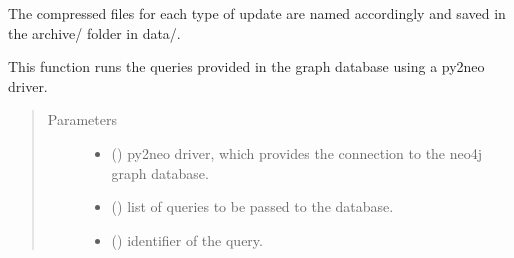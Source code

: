 \documentclass[letterpaper,10pt,english]{sphinxmanual}
\begin{document}
The compressed files for each type of update are named accordingly and saved in the archive/ folder
in data/.

\begin{fulllineitems}
\label{\detokenize{_autosummary/graphdb_builder.builder:graphdb_builder.builder.loader.load_into_database}}
This function runs the queries provided in the graph database using a py2neo driver.
\begin{quote}\begin{description}
\item[{Parameters}] \leavevmode\begin{itemize}
\item {} 
 () \textendash{} py2neo driver, which provides the connection to the neo4j graph database.

\item {} 
 (\sphinxstyleliteralemphasis{\sphinxupquote{{[}}}\sphinxstyleliteralemphasis{\sphinxupquote{{]}}}) \textendash{} list of queries to be passed to the database.

\item {} 
 () \textendash{} identifier of the query.

\end{itemize}

\end{description}\end{quote}

\end{fulllineitems}

\end{document}
